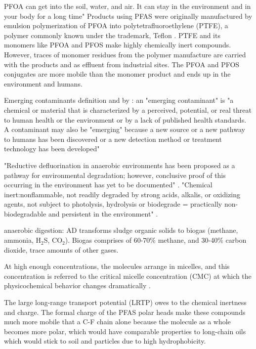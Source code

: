 PFOA can get into the soil, water, and air. It can stay in the environment and in your body for a long time" Products using PFAS were originally manufactured by emulsion polymerization of PFOA into polytetrafluoroethylene (PTFE), a polymer commonly known under the trademark, Teflon\textsuperscript{\texttrademark} \citep{Lehmler2005}. PTFE and its monomers like PFOA and PFOS make highly chemically inert compounds. However, traces of monomer residues from the polymer manufacture are carried with the products and as effluent from industrial sites. The PFOA and PFOS conjugates are more mobile than the monomer product and ends up in the environment and humans. 

Emerging contaminants definition \citep{Li2019} and by \citep{EPA2014}: an "emerging contaminant" is "a chemical or material that is characterized by a perceived, potential, or real threat to human health or the environment or by a lack of published health standards. A contaminant may also be "emerging" because a new source or a new pathway to humans has been discovered or a new detection method or treatment technology has been developed"

"Reductive defluorination in anaerobic environments has been proposed as a pathway for environmental degradation; however, conclusive proof of this occurring in the environment has yet to be documented" \citep{ArpNGI}. "Chemical inert:nonflammable, not readily degraded by strong acids, alkalis, or oxidizing agents, not subject to photolysis, hydrolysis or biodegrade  = practically non-biodegradable and persistent in the environment" \citep{Lau2007,EPA2014}. 

anaerobic digestion: AD transforms sludge organic solids to biogas (methane, ammonia, H$_2$S, CO$_2$). Biogas comprises of 60-70\% methane, and 30-40\% carbon dioxide, trace amounts of other gases.

At high enough concentrations, the molecules arrange in micelles, and this concentration is referred to the critical micelle concentration (CMC) at which the physicochemical behavior changes dramatically \citep{bhhatarai2011,Goss2009comment}.  

The large long-range transport potential (LRTP) owes to the chemical inertness and charge. The formal charge of the PFAS polar heads make these compounds much more mobile that a C-F chain alone because the molecule as a whole becomes more polar, which would have comparable properties to long-chain oils which would stick to soil and particles due to high hydrophobicity.

